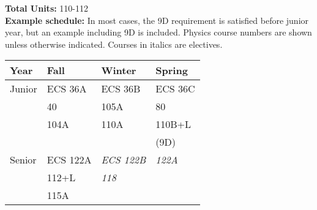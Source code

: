 \documentclass[12pt]{article}
\begin{document}
{\bf Total Units:} 110-112\\
\vskip 0.25cm
\noindent
{\bf Example schedule:} In most cases, the 9D requirement is
satisfied before junior year, but an example including 9D is included.
Physics course numbers are shown unless otherwise indicated.  Courses
in italics are electives.\\
\begin{center}
\begin{tabular}{|l|l|l|l|}
\hline
Year      & Fall    & Winter & Spring \\
\hline
Junior    & ECS 36A    & ECS 36B      & ECS 36C \\
          & 40         & 105A         & 80 \\
          & 104A       & 110A         & 110B+L \\
          &            &              & (9D) \\         
\hline
Senior   & ECS 122A    & {\it ECS 122B} & {\it 122A} \\
         & 112+L       & {\it 118}      & \\
         & 115A        &                & \\
\hline
\end{tabular}
\end{center}
\end{document}
